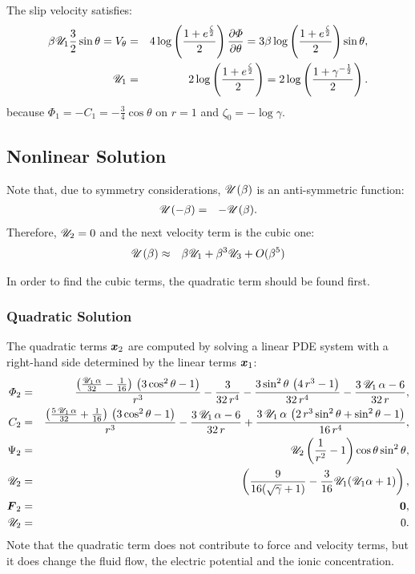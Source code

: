 The slip velocity satisfies:
\begin{eqnarray}
\beta \mathscr{U}_1 \frac{3}{2} \sin\theta =
V_\theta &=& 4 \log \left(\frac{1 + e ^ \frac{\zeta}{2}}{2}\right) \frac{\partial \varPhi}{\partial \theta} 
=
 3 \beta \log \left(\frac{1 + e ^ \frac{\zeta}{2}}{2}\right) \sin\theta, \\
\mathscr{U}_1 &=& 2 \log \left(\frac{1 + e ^ \frac{\zeta}{2}}{2}\right) 
       =  2 \log \left(\frac{1 + \gamma ^ {-\frac{1}{2}}}{2}\right).
\end{eqnarray}
because $\varPhi_1 = -C_1 = -\frac{3}{4} \cos\theta$ on $r=1$
and $\zeta_0 = -\log\gamma$.

\subsection{Nonlinear Solution}
Note that, due to symmetry considerations, $\mathscr{U}(\beta)$ is an anti-symmetric function:
\begin{eqnarray}
\mathscr{U}(-\beta) &=& -\mathscr{U}(\beta).
\end{eqnarray}
Therefore, $\mathscr{U}_2 = 0$ and the next velocity term is the cubic one:
\begin{eqnarray}
\mathscr{U}(\beta) &\approx& \beta \mathscr{U}_1 + \beta^3 \mathscr{U}_3 + O(\beta^5)
\end{eqnarray}

In order to find the cubic terms, the quadratic term should be found first.

\subsubsection{Quadratic Solution}
The quadratic terms $\boldsymbol{x}_2$ are computed by solving a linear PDE system 
with a right-hand side determined by the linear terms $\boldsymbol{x}_1$:
\begin{eqnarray}
\varPhi_2 &=& \frac{\left(\frac{\mathscr{U}_1\, \alpha}{32} - \frac{1}{16}\right)\, \left(3\, {\cos^2\theta} - 1\right)}{r^3} - \frac{3}{32\, r^4} - \frac{3\, {\sin^2\theta}\, \left(4\, r^3 - 1\right)}{32\, r^4} - \frac{3\, \mathscr{U}_1\, \alpha - 6}{32\, r},
\\
C_2 &=& \frac{\left(\frac{5\, \mathscr{U}_1\, \alpha}{32} + \frac{1}{16}\right)\, \left(3\, {\cos^2\theta} - 1\right)}{r^3} - \frac{3\, \mathscr{U}_1\, \alpha - 6}{32\, r} + \frac{3\, \mathscr{U}_1\, \alpha\, \left(2\, r^3\, {\sin^2\theta} + {\sin^2\theta} - 1\right)}{16\, r^4},
\\
\Psi_2 &=& \mathscr{U}_2
 \left(\frac{1}{r^2} - 1\right) \cos\theta \sin^2\theta,  \\
\mathscr{U}_2 &=& \left(\frac{9}{16(\sqrt{\gamma}+1)} - \frac{3}{16} \mathscr{U}_1 (\mathscr{U}_1 \alpha + 1)\right),\\
\boldsymbol{F}_2 &=& \boldsymbol{0}, \\ \mathscr{U}_2 &=& 0.
\end{eqnarray}
Note that the quadratic term does not contribute to force and velocity terms, but it does
change the fluid flow, the electric potential and the ionic concentration.

